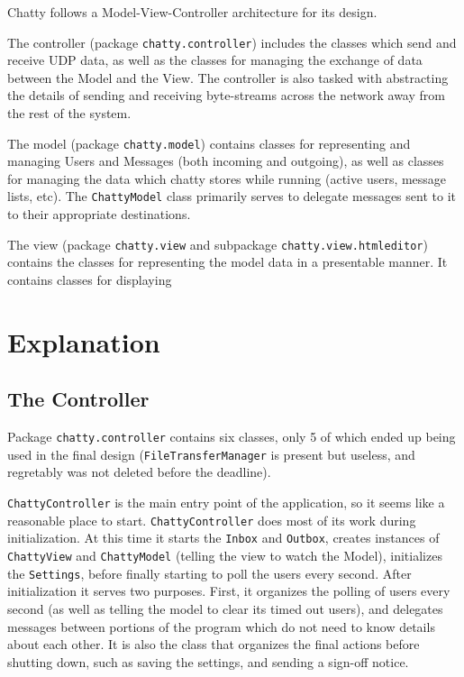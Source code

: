 \documentclass[oneside,article]{memoir}
\begin{document}
Chatty follows a Model-View-Controller architecture for its design.

The controller (package \texttt{chatty.controller}) includes the classes
which send and receive UDP data, as well as the classes for managing
the exchange of data between the Model and the View. The controller is
also tasked with abstracting the details of sending and receiving
byte-streams across the network away from the rest of the system.

The model (package \texttt{chatty.model}) contains classes for representing
and managing Users and Messages (both incoming and outgoing), as well
as classes for managing the data which chatty stores while running
(active users, message lists, etc). The \texttt{ChattyModel} class primarily
serves to delegate messages sent to it to their appropriate
destinations.

The view (package \texttt{chatty.view} and subpackage
\texttt{chatty.view.htmleditor}) contains the classes for representing the
model data in a presentable manner. It contains classes for
displaying

\section{Explanation}
\label{explanation}

\subsection{The Controller}
\label{thecontroller}

Package \texttt{chatty.controller} contains six classes, only 5 of which
ended up being used in the final design (\texttt{FileTransferManager} is
present but useless, and regretably was not deleted before the
deadline).

\texttt{ChattyController} is the main entry point of the application, so it
seems like a reasonable place to start. \texttt{ChattyController} does most
of its work during initialization. At this time it starts the \texttt{Inbox}
and \texttt{Outbox}, creates instances of \texttt{ChattyView} and \texttt{ChattyModel}
(telling the view to watch the Model), initializes the \texttt{Settings},
before finally starting to poll the users every second. After
initialization it serves two purposes. First, it organizes the
polling of users every second (as well as telling the model to clear
its timed out users), and delegates messages between portions of the
program which do not need to know details about each other. It is also
the class that organizes the final actions before shutting down,
such as saving the settings, and sending a sign-off notice.
\end{document}
